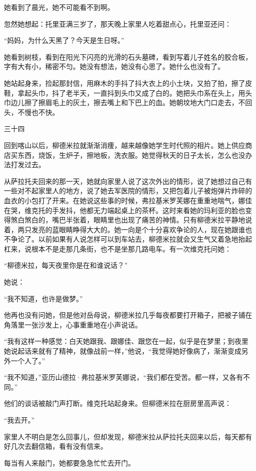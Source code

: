 她看到了晨光，她不可能看不到啊。

忽然她想起：托里亚满三岁了，那天晚上家里人吃着甜点心，托里亚还问：

“妈妈，为什么天黑了？今天是生日呀。”

她看到树枝，看到在阳光下闪亮的光滑的石头墓碑，看到写着儿子姓名的胶合板，字有大有小，稀密不匀。她没有想法，她没有心思了。她什么也没有了。

她站起身来，捡起那封信，用麻木的手抖了抖大衣上的小土块，又拍了拍，擦了皮鞋，拿起头巾，抖了老半天，一直抖到头巾又成了白的。她把头巾系在头上，用头巾边儿擦了擦眉毛上的灰土，擦去嘴上和下巴上的血。她朝坟地大门口走去，不回头，不慢也不快。

三十四

回到喀山以后，柳德米拉就渐渐消痩，越来越像她学生时代照的相片。她上供应商店买东西，烧饭，生炉子，擦地板，洗衣服。她觉得秋天的日子太长，怎么也没办法打发过去。

从萨拉托夫回来的那一天，她就向家里人说了这次外出的情形，说了她想过自己有一些对不起家里人的地方，说了她去军医院的情形，又把包着儿子被炮弹片炸碎的血衣的小包打了开来。在她说这些事的时候，弗拉基米罗芙娜在重重地喘气，娜佳在哭，维克托的手发抖，他都无力端起桌上的茶杯。这时来看她的玛利亚的脸也变得煞白煞白的，嘴巴半张着，眼睛里也出现了痛苦的神情。只有柳德米拉平静地说着，两只发亮的蓝眼睛睁得大大的。她一向是个十分喜欢争论的人，现在她跟谁也不争论了。以前如果有人说怎样可以到车站去，柳德米拉就会又生气又着急地抬起杠来，说根本不是走那几条街，也不是坐那几路电车。有一次维克托问她：

“柳德米拉，每天夜里你是在和谁说话？”

她说：

“我不知道，也许是做梦。”

他再也没有问她，但是他对岳母说，柳德米拉几乎每夜都要打开箱子，把被子铺在角落里一张沙发上，心事重重地在小声说话。

“我有这样一种感觉：白天她跟我、跟娜佳、跟您在一起，似乎是在梦里；到夜里她说起话来就有了精神，就像战前一样，”他说，“我觉得她好像病了，渐渐变成另外一个人了。”

“我不知道，”亚历山德拉·弗拉基米罗芙娜说，“我们都在受苦。都一样，又各有不同。”

他们的谈话被敲门声打断。维克托站起身来。但柳德米拉在厨房里高声说：

“我去开。”

家里人不明白是怎么回事儿，但却发现，柳德米拉从萨拉托夫回来以后，每天都有好几次去翻信箱，看有没有信来。

每当有人来敲门，她都要急急忙忙去开门。

